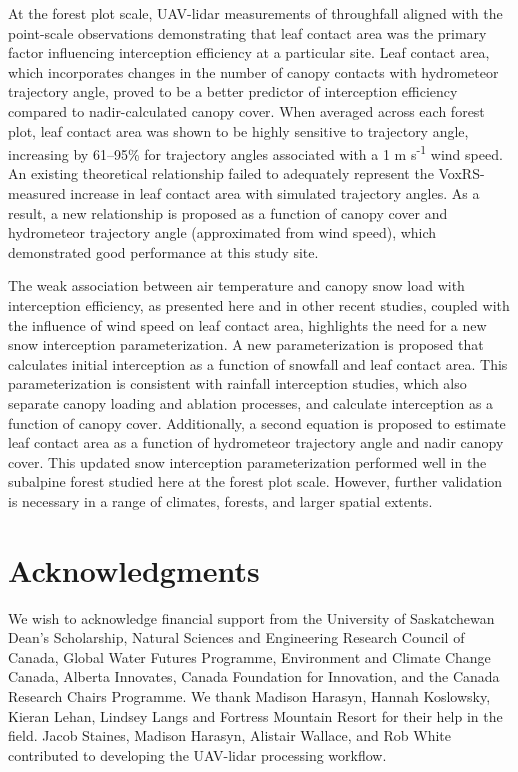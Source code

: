 \documentclass[
  letterpaper,
  DIV=11,
  numbers=noendperiod]{scrartcl}
\begin{document}
At the forest plot scale, UAV-lidar measurements of throughfall aligned
with the point-scale observations demonstrating that leaf contact area
was the primary factor influencing interception efficiency at a
particular site. Leaf contact area, which incorporates changes in the
number of canopy contacts with hydrometeor trajectory angle, proved to
be a better predictor of interception efficiency compared to
nadir-calculated canopy cover. When averaged across each forest plot,
leaf contact area was shown to be highly sensitive to trajectory angle,
increasing by 61--95\% for trajectory angles associated with a 1 m
s\textsuperscript{-1} wind speed. An existing theoretical relationship
failed to adequately represent the VoxRS-measured increase in leaf
contact area with simulated trajectory angles. As a result, a new
relationship is proposed as a function of canopy cover and hydrometeor
trajectory angle (approximated from wind speed), which demonstrated good
performance at this study site.

The weak association between air temperature and canopy snow load with
interception efficiency, as presented here and in other recent studies,
coupled with the influence of wind speed on leaf contact area,
highlights the need for a new snow interception parameterization. A new
parameterization is proposed that calculates initial interception as a
function of snowfall and leaf contact area. This parameterization is
consistent with rainfall interception studies, which also separate
canopy loading and ablation processes, and calculate interception as a
function of canopy cover. Additionally, a second equation is proposed to
estimate leaf contact area as a function of hydrometeor trajectory angle
and nadir canopy cover. This updated snow interception parameterization
performed well in the subalpine forest studied here at the forest plot
scale. However, further validation is necessary in a range of climates,
forests, and larger spatial extents.

\section{Acknowledgments}\label{acknowledgments}

We wish to acknowledge financial support from the University of
Saskatchewan Dean's Scholarship, Natural Sciences and Engineering
Research Council of Canada, Global Water Futures Programme, Environment
and Climate Change Canada, Alberta Innovates, Canada Foundation for
Innovation, and the Canada Research Chairs Programme. We thank Madison
Harasyn, Hannah Koslowsky, Kieran Lehan, Lindsey Langs and Fortress
Mountain Resort for their help in the field. Jacob Staines, Madison
Harasyn, Alistair Wallace, and Rob White contributed to developing the
UAV-lidar processing workflow.
\end{document}
